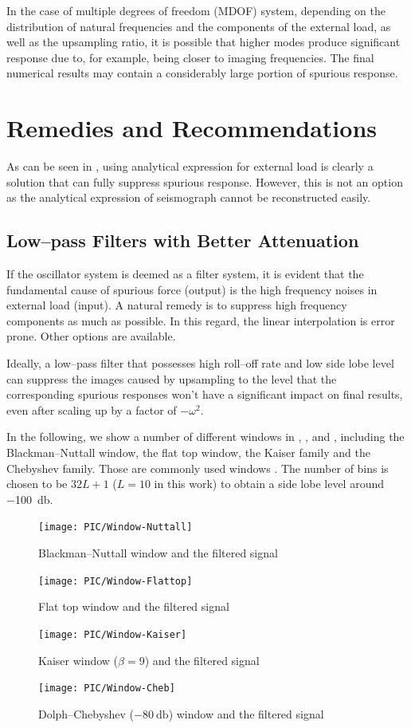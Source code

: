 In the case of multiple degrees of freedom (MDOF) system, depending on the distribution of natural frequencies and the components of the external load, as well as the upsampling ratio, it is possible that higher modes produce significant response due to, for example, being closer to imaging frequencies. The final numerical results may contain a considerably large portion of spurious response.
\section{Remedies and Recommendations}
As can be seen in , using analytical expression for external load is clearly a solution that can fully suppress spurious response. However, this is not an option as the analytical expression of seismograph cannot be reconstructed easily.
\subsection{Low--pass Filters with Better Attenuation}
If the oscillator system is deemed as a filter system, it is evident that the fundamental cause of spurious force (output) is the high frequency noises in external load (input). A natural remedy is to suppress high frequency components as much as possible. In this regard, the linear interpolation is error prone. Other options are available.

Ideally, a low--pass filter that possesses high roll--off rate and low side lobe level can suppress the images caused by upsampling to the level that the corresponding spurious responses won't have a significant impact on final results, even after scaling up by a factor of $-\omega^2$.

In the following, we show a number of different windows in , ,  and , including the Blackman--Nuttall window, the flat top window, the Kaiser family and the Chebyshev family. Those are commonly used windows \citep{Oppenheim2010}. The number of bins is chosen to be $32L+1$ ($L=10$ in this work) to obtain a side lobe level around \SI{-100}{\decibel}.
\begin{figure}[htb!]
\centering
\texttt{[image: PIC/Window-Nuttall]}
\caption{Blackman--Nuttall window and the filtered signal}\label{fig:nuttall_window}
\end{figure}
\begin{figure}[htb!]
\centering
\texttt{[image: PIC/Window-Flattop]}
\caption{Flat top window and the filtered signal}\label{fig:flattop_window}
\end{figure}
\begin{figure}[htb!]
\centering
\texttt{[image: PIC/Window-Kaiser]}
\caption{Kaiser window ($\beta=9$) and the filtered signal}\label{fig:kaiser_window}
\end{figure}
\begin{figure}[htb!]
\centering
\texttt{[image: PIC/Window-Cheb]}
\caption{Dolph--Chebyshev ($\SI{-80}{\decibel}$) window and the filtered signal}\label{fig:cheb_window}
\end{figure}


